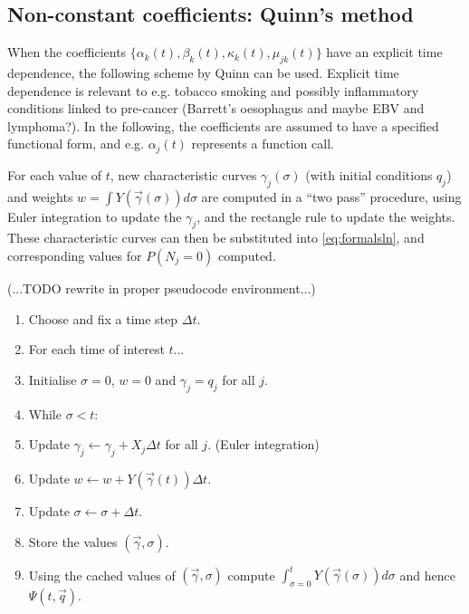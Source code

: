 \documentclass{article}
\begin{document}
\subsection*{Non-constant coefficients: Quinn's method}
When the coefficients $\{\alpha_k(t), \beta_k(t), \kappa_k(t), \mu_{jk}(t)\}$
have an explicit time dependence, the following scheme by Quinn can be used\cite{quinn1989calculating}. Explicit time dependence is relevant to e.g. tobacco smoking
and possibly inflammatory conditions linked to pre-cancer (Barrett's oesophagus and maybe
EBV and lymphoma?). In the following, the coefficients are assumed to have a
specified functional form, and e.g. $\alpha_j(t)$ represents a function call.

For each value of $t$, new characteristic curves $\gamma_j(\sigma)$ (with initial
conditions $q_j$) and weights
$w = \int Y(\vec{\gamma}(\sigma)) d\sigma$ are computed in a ``two pass'' procedure, using Euler
integration to update the $\gamma_j$, and the rectangle rule to update the
weights. These
characteristic curves can then be substituted into \eqref{eq:formalsln}, and
corresponding values for $P(N_j = 0)$ computed.

(...TODO rewrite in proper pseudocode environment...)

\begin{enumerate}
    \item Choose and fix a time step $\Delta t$.
    \item For each time of interest $t$...
    \item Initialise $\sigma = 0$, $w = 0$ and $\gamma_j = q_j$ for all $j$.
    \item While $\sigma < t$:
    \item Update $\gamma_j \leftarrow \gamma_j + X_j \Delta t$ for all $j$.
    (Euler integration)
    \item Update $w \leftarrow w + Y(\vec{\gamma}(t)) \Delta t$.
    \item Update $\sigma \leftarrow \sigma + \Delta t$.
    \item Store the values $(\vec{\gamma}, \sigma)$.
    \item Using the cached values of $(\vec{\gamma}, \sigma)$ compute $\int_{\sigma=0}^t
    Y(\vec{\gamma}(\sigma)) d\sigma$ and hence $\Psi(t, \vec{q})$.
\end{enumerate}
\end{document}
